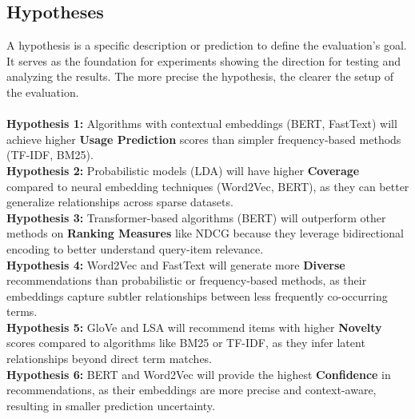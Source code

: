 \documentclass[\myFontSize,oneside,english,hidelinks,a4paper]{article}
\begin{document}
\subsection{Hypotheses}
A hypothesis is a specific description or prediction to define the evaluation's goal. It serves as the foundation for experiments showing the direction for testing and analyzing the results. The more precise the hypothesis, the clearer the setup of the evaluation.\\\\
\textbf{Hypothesis 1:} Algorithms with contextual embeddings (BERT, FastText) will achieve higher \textbf{Usage Prediction} scores than simpler frequency-based methods (TF-IDF, BM25).\\
%
\textbf{Hypothesis 2:} Probabilistic models (LDA) will have higher \textbf{Coverage} compared to neural embedding techniques (Word2Vec, BERT), as they can better generalize relationships across sparse datasets.\\
%
\textbf{Hypothesis 3:} Transformer-based algorithms (BERT) will outperform other methods on \textbf{Ranking Measures} like NDCG because they leverage bidirectional encoding to better understand query-item relevance.\\
%
\textbf{Hypothesis 4:} Word2Vec and FastText will generate more \textbf{Diverse} recommendations than probabilistic or frequency-based methods, as their embeddings capture subtler relationships between less frequently co-occurring terms.\\
%
\textbf{Hypothesis 5:} GloVe and LSA will recommend items with higher \textbf{Novelty} scores compared to algorithms like BM25 or TF-IDF, as they infer latent relationships beyond direct term matches.\\
%
\textbf{Hypothesis 6:} BERT and Word2Vec will provide the highest \textbf{Confidence} in recommendations, as their embeddings are more precise and context-aware, resulting in smaller prediction uncertainty.\\
%
%
%
%
%
%
\end{document}
